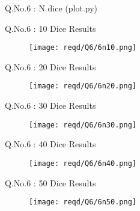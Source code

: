 \documentclass{beamer}
\begin{document}
\begin{frame}{Q.No.6 : N dice (plot.py)}
	
\end{frame}


\begin{frame}{Q.No.6 : 10 Dice Results}
	\begin{figure}
		\centering
		\texttt{[image: reqd/Q6/6n10.png]}
	\end{figure}
\end{frame}


\begin{frame}{Q.No.6 : 20 Dice Results}
	\begin{figure}
		\centering
		\texttt{[image: reqd/Q6/6n20.png]}
	\end{figure}
\end{frame}


\begin{frame}{Q.No.6 : 30 Dice Results}
	\begin{figure}
		\centering
		\texttt{[image: reqd/Q6/6n30.png]}
	\end{figure}
\end{frame}


\begin{frame}{Q.No.6 : 40 Dice Results}
	\begin{figure}
		\centering
		\texttt{[image: reqd/Q6/6n40.png]}
	\end{figure}
\end{frame}


\begin{frame}{Q.No.6 : 50 Dice Results}
	\begin{figure}
		\centering
		\texttt{[image: reqd/Q6/6n50.png]}
	\end{figure}
\end{frame}
\end{document}
